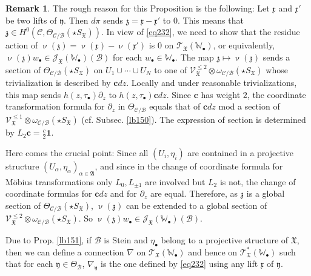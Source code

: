 \documentclass[11pt,b5paper,notitlepage]{article}
\theoremstyle{definition}
\newtheorem{rem}[df]{Remark}
\theoremstyle{plain}
\newcommand{\fk}{\mathfrak}
\newcommand{\mc}{\mathcal}
\newcommand{\id}{\mathbf{1}}
\newcommand{\scr}{\mathscr}
\newcommand{\xk}{\mathfrak x}
\newcommand{\yk}{\mathfrak y}
\newcommand{\zk}{\mathfrak z}
\newcommand{\SX}{{S_{\fk X}}}
\newcommand{\blt}{\bullet}
\newcommand{\Wbb}{\mathbb W}
\newcommand{\cbf}{\mathbf c}
\numberwithin{equation}{section}
\begin{document}
\begin{rem}
The rough reason for this Proposition is the following: Let $\xk$ and $\xk'$ be two lifts of $\yk$. Then $d\pi$ sends $\zk=\xk-\xk'$ to $0$. This means that $\zk\in H^0(\mc C,\Theta_{\mc C/\mc B}(\star\SX))$. In view of \eqref{eq232}, we need to show that the residue action of $\upnu(\zk)=\upnu(\xk)-\upnu(\xk')$ is $0$ on $\scr T_{\fk X}(\Wbb_\blt)$, or equivalently, $\upnu(\zk)w_\blt\in\scr J_{\fk X}(\Wbb_\blt)(\mc B)$ for each $w_\blt\in\Wbb_\blt$. The map $\zk\mapsto \upnu(\zk)$ sends a section of $\Theta_{\mc C/\mc B}(\star\SX)$ on $U_1\cup\cdots\cup U_N$ to one of $\scr V_{\fk X}^{\leq 2}\otimes\omega_{\mc C/\mc B}(\star\SX)$ whose trivialization is described by  $\cbf dz$. Locally and under reasonable trivializations, this map sends $h(z,\tau_\blt)\partial_z$ to $h(z,\tau_\blt)\cbf dz$. Since $\cbf$ has weight $2$, the coordinate transformation formula for $\partial_z$ in $\Theta_{\mc C/\mc B}$ equals that of $\cbf dz$ mod a section of $\scr V_{\fk X}^{\leq 1}\otimes\omega_{\mc C/\mc B}(\star\SX)$ (cf. Subsec. \ref{lb150}).  The expression of section is determined by $L_2\cbf=\frac c{2}\id$.

Here comes the crucial point: Since all $(U_i,\eta_i)$ are contained in a projective structure $(U_\alpha,\eta_\alpha)_{\alpha\in\fk A}$, and since in the change of coordinate formula for M\"obius transformations only $L_0,L_{\pm1}$ are involved but $L_2$ is not, the change of coordinate formulas for $\cbf dz$ and for $\partial_z$ are equal. Therefore, as $\zk$ is a global section of $\Theta_{\mc C/\mc B}(\star\SX)$, $\upnu(\zk)$ can be extended to a global section of $\scr V_{\fk X}^{\leq 2}\otimes\omega_{\mc C/\mc B}(\star\SX)$. So $\upnu(\zk)w_\blt\in\scr J_{\fk X}(\Wbb_\blt)(\mc B)$. \hfill\qedsymbol
\end{rem}



Due to Prop. \ref{lb151}, if $\mc B$ is Stein and $\eta_\blt$ belong to a projective structure of $\fk X$, then we can define a connection $\nabla$ on $\scr T_{\fk X}(\Wbb_\blt)$ and hence on $\scr T_{\fk X}^*(\Wbb_\blt)$ such that for each $\yk\in\Theta_{\mc B}$, $\nabla_\yk$ is the one defined by \eqref{eq232} using any lift $\xk$ of $\yk$.
\end{document}
